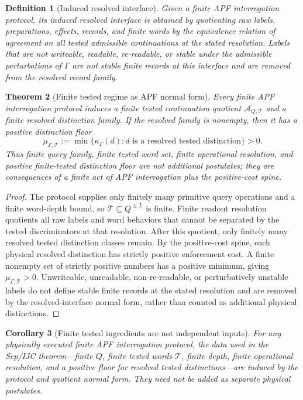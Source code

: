 \documentclass[11pt]{article}
\newtheorem{theorem}{Theorem}[section]
\newtheorem{corollary}[theorem]{Corollary}
\newtheorem{definition}[theorem]{Definition}
\begin{document}
\begin{definition}[Induced resolved interface]\label{def:induced-resolved-interface}
Given a finite APF interrogation protocol, its induced resolved interface is obtained by quotienting raw labels, preparations, effects, records, and finite words by the equivalence relation of agreement on all tested admissible continuations at the stated resolution.  Labels that are not writeable, readable, re-readable, or stable under the admissible perturbations of $\Gamma$ are not stable finite records at this interface and are removed from the resolved record family.
\end{definition}

\begin{theorem}[Finite tested regime as APF normal form]\label{thm:finite-tested-normal-form}
Every finite APF interrogation protocol induces a finite tested continuation quotient $\mathcal A_{Q,\mathcal T}$ and a finite resolved distinction family.  If the resolved family is nonempty, then it has a positive distinction floor
\[
\mu_{\Gamma,\mathcal T}:=\min\{\kappa_\Gamma(d): d \text{ is a resolved tested distinction}\}>0.
\]
Thus finite query family, finite tested word set, finite operational resolution, and positive finite-tested distinction floor are not additional postulates; they are consequences of a finite act of APF interrogation plus the positive-cost spine.
\end{theorem}
\begin{proof}
The protocol supplies only finitely many primitive query operations and a finite word-depth bound, so $\mathcal T\subseteq Q^{\le L}$ is finite.  Finite readout resolution quotients all raw labels and word behaviors that cannot be separated by the tested discriminators at that resolution.  After this quotient, only finitely many resolved tested distinction classes remain.  By the positive-cost spine, each physical resolved distinction has strictly positive enforcement cost.  A finite nonempty set of strictly positive numbers has a positive minimum, giving $\mu_{\Gamma,\mathcal T}>0$.  Unwriteable, unreadable, non-re-readable, or perturbatively unstable labels do not define stable finite records at the stated resolution and are removed by the resolved-interface normal form, rather than counted as additional physical distinctions.
\end{proof}

\begin{corollary}[Finite tested ingredients are not independent inputs]\label{cor:finite-tested-not-inputs}
For any physically executed finite APF interrogation protocol, the data used in the Sep/IJC theorem---finite $Q$, finite tested words $\mathcal T$, finite depth, finite operational resolution, and a positive floor for resolved tested distinctions---are induced by the protocol and quotient normal form.  They need not be added as separate physical postulates.
\end{corollary}
\end{document}
